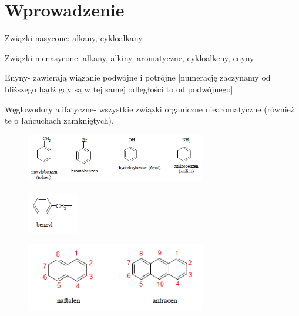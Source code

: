 \section{Wprowadzenie}

Związki nasycone: alkany, cykloalkany

Związki nienasycone: alkany, alkiny, aromatyczne, cykloalkeny, enyny
\newline

Enyny- zawierają wiązanie podwójne i potrójne [numerację zaczynamy od bliższego bądź gdy są w tej samej odległości to od podwójnego].
\newline

Węglowodory alifatyczne- wszystkie związki organiczne niearomatyczne (również te o łańcuchach zamkniętych).
\newline

\begin{figure}[H]
    \centering
    \includegraphics[width=0.7\textwidth]{img/benzeny}
    \label{fig.benzeny}
\end{figure}

\begin{figure}[H]
    \centering
    \includegraphics[width=0.2\textwidth]{img/benzyl}
    \label{fig.benzyl}
\end{figure}

\begin{figure}[H]
    \centering
    \includegraphics[width=0.7\textwidth]{img/naftalen}
    \label{fig.naftalen}
\end{figure}